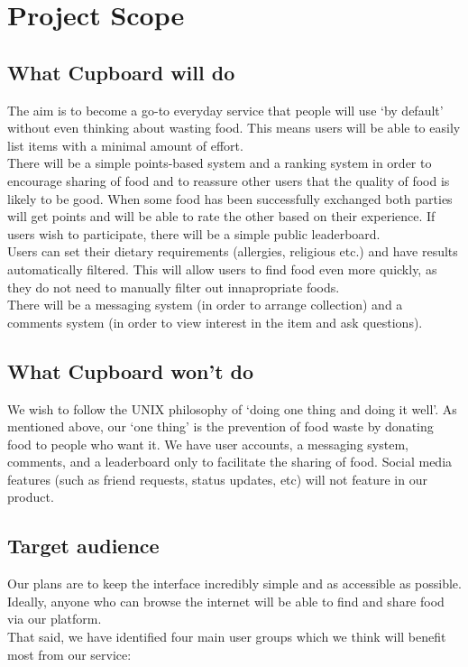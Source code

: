 \documentclass[12pt]{article}
\begin{document}
\section{Project Scope}
\subsection{What Cupboard will do}
The aim is to become a go-to everyday service that people will use `by default'
without even thinking about wasting food. This means users will be able to
easily list items with a minimal amount of effort.\\
There will be a simple points-based system and a ranking system in order to
encourage sharing of food and to reassure other users that the quality of food is
likely to be good. When some food has been successfully exchanged both
parties will get points and will be able to rate the other based on their experience. If users wish to
participate, there will be a simple public leaderboard.\\
Users can set their dietary requirements (allergies, religious etc.) and have
results automatically filtered. This will allow users to find food even more quickly, as they do not need to manually filter out innapropriate foods.\\
There will be a messaging system (in order to arrange collection) and a comments
system (in order to view interest in the item and ask questions).\\
\subsection{What Cupboard won't do}
We wish to follow the UNIX philosophy of `doing one thing and doing it well'. As mentioned above,
our `one thing' is the prevention of food waste by donating food to people who want it.
We have user accounts, a messaging system, comments, and a leaderboard only to facilitate the sharing of food.
Social media features (such as friend requests, status updates, etc) will not feature in our product.

\subsection{Target audience}
Our plans are to keep the interface incredibly simple and as accessible as possible. 
Ideally, anyone who can browse the internet will be able to find and share food via our platform.\\
That said, we have identified four main user groups which we think will benefit most from our service:
\end{document}
